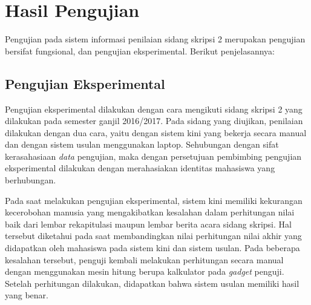 \section{Hasil Pengujian}
\label{sec:hasilUji}

	Pengujian pada sistem informasi penilaian sidang skripsi 2 merupakan pengujian bersifat fungsional, dan pengujian eksperimental. Berikut penjelasannya:
	
	\subsection{Pengujian Eksperimental}
	\label{sub: PEksperimen}
	
	Pengujian eksperimental dilakukan dengan cara mengikuti sidang skripsi 2 yang dilakukan pada semester ganjil 2016/2017. Pada sidang yang diujikan, penilaian dilakukan dengan dua cara, yaitu dengan sistem kini yang bekerja secara manual dan dengan sistem usulan menggunakan laptop. Sehubungan dengan sifat kerasahasiaan \textit{data} pengujian, maka dengan persetujuan pembimbing pengujian eksperimental dilakukan dengan merahasiakan identitas mahasiswa yang berhubungan.
	
	Pada saat melakukan pengujian eksperimental, sistem kini memiliki kekurangan kecerobohan manusia yang mengakibatkan kesalahan dalam perhitungan nilai baik dari lembar rekapitulasi maupun lembar berita acara sidang skripsi. Hal tersebut diketahui pada saat membandingkan nilai perhitungan nilai akhir yang didapatkan oleh mahasiswa pada sistem kini dan sistem usulan. Pada beberapa kesalahan tersebut, penguji kembali melakukan perhitungan secara manual dengan menggunakan mesin hitung berupa kalkulator pada \textit{gadget} penguji. Setelah perhitungan dilakukan, didapatkan bahwa sistem usulan memiliki hasil yang benar.
	
